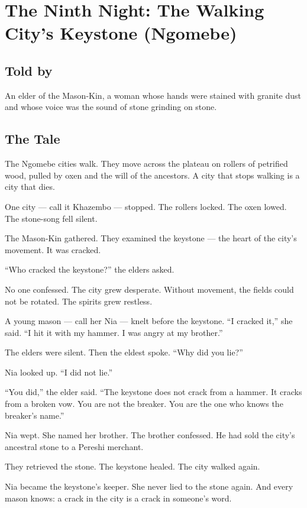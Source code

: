 \documentclass[10pt,twoside]{book}
\begin{document}
\chapter{The Ninth Night: The Walking City's Keystone (Ngomebe)}

\section*{Told by}
An elder of the Mason-Kin, a woman whose hands were stained with granite dust and whose voice was the sound of stone grinding on stone.

\section*{The Tale}
The Ngomebe cities walk. They move across the plateau on rollers of petrified wood, pulled by oxen and the will of the ancestors. A city that stops walking is a city that dies.

One city --- call it Khazembo --- stopped. The rollers locked. The oxen lowed. The stone-song fell silent.

The Mason-Kin gathered. They examined the keystone --- the heart of the city's movement. It was cracked.

``Who cracked the keystone?'' the elders asked.

No one confessed. The city grew desperate. Without movement, the fields could not be rotated. The spirits grew restless.

A young mason --- call her Nia --- knelt before the keystone. ``I cracked it,'' she said. ``I hit it with my hammer. I was angry at my brother.''

The elders were silent. Then the eldest spoke. ``Why did you lie?''

Nia looked up. ``I did not lie.''

``You did,'' the elder said. ``The keystone does not crack from a hammer. It cracks from a broken vow. You are not the breaker. You are the one who knows the breaker's name.''

Nia wept. She named her brother. The brother confessed. He had sold the city's ancestral stone to a Pereshi merchant.

They retrieved the stone. The keystone healed. The city walked again.

Nia became the keystone's keeper. She never lied to the stone again. And every mason knows: a crack in the city is a crack in someone's word.
\end{document}
